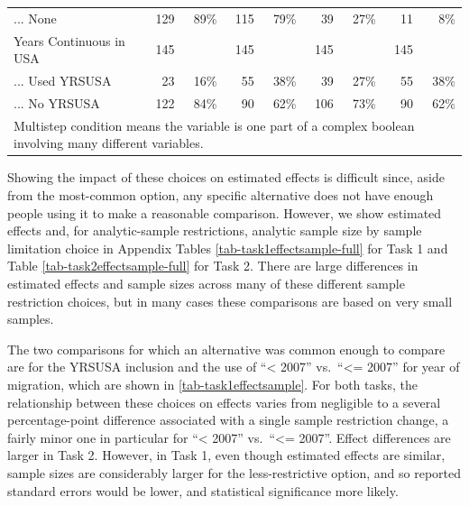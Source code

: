 \documentclass[
  letterpaper,
  DIV=11,
  numbers=noendperiod]{scrartcl}
\begin{document}
\begin{table}[!htbp]
{\begin{tabular}{lrrrrrrrr}
... None & 129 & 89\% & 115 & 79\% & 39 & 27\% & 11 & 8\% \\ 
Years Continuous in USA & 145 &  & 145 &  & 145 &  & 145 &  \\ 
... Used YRSUSA & 23 & 16\% & 55 & 38\% & 39 & 27\% & 55 & 38\% \\ 
... No YRSUSA & 122 & 84\% & 90 & 62\% & 106 & 73\% & 90 & 62\%\\ 
\hline
\hline
\multicolumn{9}{l}{Multistep condition means the variable is one part of a complex boolean involving many different variables.}\\ 
\end{tabular}
}
\end{table}

Showing the impact of these choices on estimated effects is difficult
since, aside from the most-common option, any specific alternative does
not have enough people using it to make a reasonable comparison.
However, we show estimated effects and, for analytic-sample
restrictions, analytic sample size by sample limitation choice in
Appendix Tables \ref{tab-task1effectsample-full} for Task 1 and Table
\ref{tab-task2effectsample-full} for Task 2. There are large differences
in estimated effects and sample sizes across many of these different
sample restriction choices, but in many cases these comparisons are
based on very small samples.

The two comparisons for which an alternative was common enough to
compare are for the YRSUSA inclusion and the use of ``\textless{} 2007''
vs.~``\textless= 2007'' for year of migration, which are shown in
\ref{tab-task1effectsample}. For both tasks, the relationship between
these choices on effects varies from negligible to a several
percentage-point difference associated with a single sample restriction
change, a fairly minor one in particular for ``\textless{} 2007''
vs.~``\textless= 2007''. Effect differences are larger in Task 2.
However, in Task 1, even though estimated effects are similar, sample
sizes are considerably larger for the less-restrictive option, and so
reported standard errors would be lower, and statistical significance
more likely.
\end{document}
